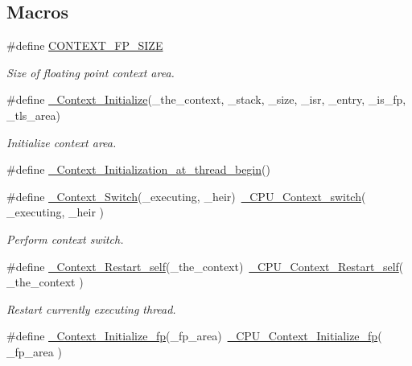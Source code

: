 \subsection*{Macros}
\begin{DoxyCompactItemize}
\item 
\#define \mbox{\hyperlink{group__RTEMSScoreContext_gab5a3d965b96e9d5ed36aa5d28514a0c9}{C\+O\+N\+T\+E\+X\+T\+\_\+\+F\+P\+\_\+\+S\+I\+ZE}}
\begin{DoxyCompactList}\small\item\em Size of floating point context area. \end{DoxyCompactList}\item 
\#define \mbox{\hyperlink{group__RTEMSScoreContext_ga58ee7a020994c31e741b3c431eea168e}{\+\_\+\+Context\+\_\+\+Initialize}}(\+\_\+the\+\_\+context,  \+\_\+stack,  \+\_\+size,  \+\_\+isr,  \+\_\+entry,  \+\_\+is\+\_\+fp,  \+\_\+tls\+\_\+area)
\begin{DoxyCompactList}\small\item\em Initialize context area. \end{DoxyCompactList}\item 
\#define \mbox{\hyperlink{group__RTEMSScoreContext_ga2ef1ba43fa949a447be59fe34ecf6e96}{\+\_\+\+Context\+\_\+\+Initialization\+\_\+at\+\_\+thread\+\_\+begin}}()
\item 
\#define \mbox{\hyperlink{group__RTEMSScoreContext_gac1e12323e6e85bbced3d57828b36fff8}{\+\_\+\+Context\+\_\+\+Switch}}(\+\_\+executing,  \+\_\+heir)~\mbox{\hyperlink{group__RTEMSScoreCPUARM_gaa9f8cc989454b28232e5375e30c90970}{\+\_\+\+C\+P\+U\+\_\+\+Context\+\_\+switch}}( \+\_\+executing, \+\_\+heir )
\begin{DoxyCompactList}\small\item\em Perform context switch. \end{DoxyCompactList}\item 
\#define \mbox{\hyperlink{group__RTEMSScoreContext_ga617942caa9af6f3cf239c6de30ce6080}{\+\_\+\+Context\+\_\+\+Restart\+\_\+self}}(\+\_\+the\+\_\+context)~\mbox{\hyperlink{v850_2include_2rtems_2score_2cpu_8h_a3fb67e174d7b61251322cd32126acd1a}{\+\_\+\+C\+P\+U\+\_\+\+Context\+\_\+\+Restart\+\_\+self}}( \+\_\+the\+\_\+context )
\begin{DoxyCompactList}\small\item\em Restart currently executing thread. \end{DoxyCompactList}\item 
\#define \mbox{\hyperlink{group__RTEMSScoreContext_ga1990ec7db775e43ae0af46e7c79b1206}{\+\_\+\+Context\+\_\+\+Initialize\+\_\+fp}}(\+\_\+fp\+\_\+area)~\mbox{\hyperlink{sparc_2include_2rtems_2score_2cpu_8h_ac34a28abe9b31559d4096b2c942860a6}{\+\_\+\+C\+P\+U\+\_\+\+Context\+\_\+\+Initialize\+\_\+fp}}( \+\_\+fp\+\_\+area )

\end{DoxyCompactItemize}
